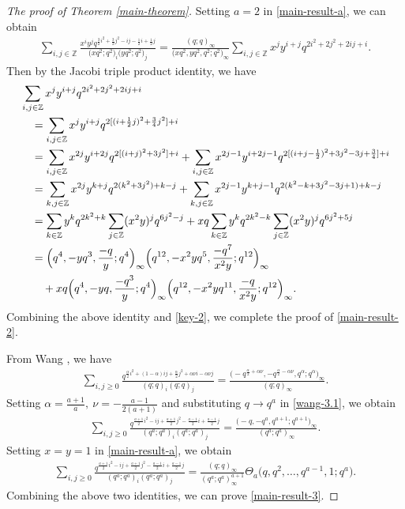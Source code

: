 \documentclass[pdftex]{sigma}
\numberwithin{equation}{section}
\theoremstyle{definition}
\begin{document}
\begin{proof}[The proof of Theorem \ref{main-theorem}]
Setting $a=2$ in \eqref{main-result-a}, we can obtain
\begin{align}\label{key-2}
\sum_{i,j\in\mathbb{Z}}\frac{x^iy^jq^{\frac{3}{2}i^2+\frac{3}{2}j^2-ij-\frac{1}{2}i +\frac{1}{2}j}}{\bigl(xq^2;q^2\bigr)_i\bigl(yq^2;q^2\bigr)_j} =\frac{(q;q)_{\infty}}{\bigl(xq^2,yq^2,q^2;q^2\bigr)_{\infty}}\sum_{i,j\in\mathbb{Z}}x^jy^{i+j}q^{2i^2+2j^2+2ij+i}.
\end{align}
Then by the Jacobi triple product identity, we have
\begin{align*}
&\sum_{i,j\in\mathbb{Z}}x^jy^{i+j}q^{2i^2+2j^2+2ij+i}\\
& \quad =\sum_{i,j\in\mathbb{Z}}x^jy^{i+j}q^{2[(i+\frac{1}{2}j)^2+\frac{3}{4}j^2]+i}\\
& \quad = \sum_{i,j\in\mathbb{Z}}x^{2j}y^{i+2j}q^{2[(i+j)^2+3j^2]+i}+\sum_{i,j\in\mathbb{Z}}x^{2j-1}y^{i+2j-1}q^{2[(i+j-\frac{1}{2})^2+3j^2-3j+\frac{3}{4}]+i}\\
& \quad =\sum_{k,j\in\mathbb{Z}}x^{2j}y^{k+j}q^{2(k^2+3j^2)+k-j}+\sum_{k,j\in\mathbb{Z}}x^{2j-1}y^{k+j-1}q^{2(k^2-k+3j^2-3j+1)+k-j}\\
& \quad =\sum_{k\in\mathbb{Z}}y^kq^{2k^2+k}\sum_{j\in\mathbb{Z}}(x^2y)^jq^{6j^2-j}+xq\sum_{k\in\mathbb{Z}}y^kq^{2k^2-k}\sum_{j\in\mathbb{Z}}(x^2y)^jq^{6j^2+5j}\\
& \quad =\Bigl(q^4,-yq^3,\frac{-q}{y};q^4\Bigr)_{\infty}\Bigl(q^{12},-x^2yq^5,\frac{-q^7}{x^2y};q^{12}\Bigr)_{\infty}\\
&\qquad +xq\Bigl(q^4,-yq,\frac{-q^3}{y};q^4\Bigr)_{\infty}\Bigl(q^{12},-x^2yq^{11},\frac{-q}{x^2y};q^{12}\Bigr)_{\infty}.
\end{align*}
Combining the above identity and \eqref{key-2}, we complete the proof of \eqref{main-result-2}.

From Wang \cite[equation~(3.1)]{Wang-2024-2}, we have
\begin{align}\label{wang-3.1}
\sum_{i,j\geq0}\frac{q^{\frac{\alpha}{2}i^2+(1-\alpha)ij+\frac{\alpha}{2}j^2+\alpha\nu i-\alpha\nu j}}{(q;q)_i(q;q)_j} =\frac{\bigl(-q^{\frac{\alpha}{2}+\alpha\nu},-q^{\frac{\alpha}{2}-\alpha\nu},q^{\alpha};q^{\alpha}\bigr)_{\infty}}{(q;q)_{\infty}}.
\end{align}
Setting $\alpha=\frac{a+1}{a},~\nu=-\frac{a-1}{2(a+1)}$ and substituting $q\rightarrow q^a$ in \eqref{wang-3.1}, we obtain
\begin{align*}
\sum_{i,j\geq0}\frac{q^{\frac{a+1}{2}i^2-ij+\frac{a+1}{2}j^2-\frac{a-1}{2}i+\frac{a-1}{2} j}}{(q^a;q^a)_i(q^a;q^a)_j}=\frac{\bigl(-q,-q^a,q^{a+1};q^{a+1}\bigr)_{\infty}}{(q^a;q^a)_{\infty}}.
\end{align*}
Setting $x=y=1$ in \eqref{main-result-a}, we obtain
\begin{align*}
\sum_{i,j\geq0}\frac{q^{\frac{a+1}{2}i^2-ij+\frac{a+1}{2}j^2-\frac{a-1}{2}i+\frac{a-1}{2} j}}{(q^a;q^a)_i(q^a;q^a)_j}=\frac{(q;q)_{\infty}}{(q^a;q^a)^{a+1}_{\infty}}\Theta_a\bigl(q,q^2,\dots,q^{a-1},1;q^a\bigr).
\end{align*}
Combining the above two identities, we can prove \eqref{main-result-3}.
\end{proof}
\end{document}
